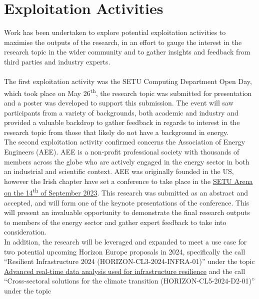 \section{Exploitation Activities}
\label{sec:exploitation}

Work has been undertaken to explore potential exploitation activities to maximise the outputs of the research, in an effort to gauge the interest in the research topic in the
wider community and to gather insights and feedback from third parties and industry experts.
\\
\\
The first exploitation activity was the SETU Computing Department Open Day, which took place on May 26\textsuperscript{th}, the research topic was submitted for presentation and a poster was
developed to support this submission. The event will saw participants from a variety of backgrounds, both academic and industry and provided a valuable backdrop to gather
feedback in regards to interest in the research topic from those that likely do not have a background in energy.
\\
The second exploitation activity confirmed concerns the Association of Energy Engineers (AEE). AEE is a non-profit professional society with thousands of members across the globe who
are actively engaged in the energy sector in both an industrial and scientific context. AEE was originally founded in the US, however the Irish chapter have set a conference to take
place in the \href{https://aeeconference.ie/}{SETU Arena on the 14\textsuperscript{th} of September 2023}. This research was submitted as an abstract and accepted, and will form one of the keynote
presentations of the conference. This will present an invaluable opportunity to demonstrate the final research outputs to members of the energy sector and gather expert feedback to take
into consideration.
\\
In addition, the research will be leveraged and expanded to meet a use case for two potential upcoming Horizon Europe proposals in 2024, specifically the call ``Resilient Infrastructure 2024 (HORIZON-CL3-2024-INFRA-01)''
under the topic \href{https://ec.europa.eu/info/funding-tenders/opportunities/portal/screen/opportunities/topic-details/horizon-cl3-2024-infra-01-03;callCode=null;freeTextSearchKeyword=resilience;matchWholeText=true;typeCodes=0,1,2,8;statusCodes=31094501,31094502;programmePeriod=null;programCcm2Id=43108390;programDivisionCode=null;focusAreaCode=null;destinationGroup=null;missionGroup=null;geographicalZonesCode=null;programmeDivisionProspect=null;startDateLte=null;startDateGte=null;crossCuttingPriorityCode=null;cpvCode=null;performanceOfDelivery=null;sortQuery=startDate;orderBy=desc;onlyTenders=false;topicListKey=topicSearchTablePageState}{Advanced real-time data analysis used for infrastructure resilience} and the call ``Cross-sectoral solutions for the climate transition (HORIZON-CL5-2024-D2-01)'' under the topic
